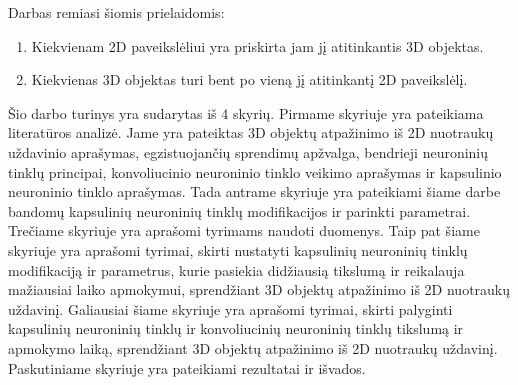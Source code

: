 Darbas remiasi šiomis prielaidomis:

\begin{enumerate}
	\item Kiekvienam 2D paveikslėliui yra priskirta jam jį atitinkantis 3D objektas.
	\item Kiekvienas 3D objektas turi bent po vieną jį atitinkantį 2D paveikslėlį.
\end{enumerate}

Šio darbo turinys yra sudarytas iš 4 skyrių. Pirmame skyriuje yra pateikiama literatūros analizė. Jame yra pateiktas 3D objektų atpažinimo iš 2D nuotraukų uždavinio aprašymas, egzistuojančių sprendimų apžvalga, bendrieji neuroninių tinklų principai, konvoliucinio neuroninio tinklo veikimo aprašymas ir kapsulinio neuroninio tinklo aprašymas.
Tada antrame skyriuje yra pateikiami šiame darbe bandomų kapsulinių neuroninių tinklų modifikacijos ir parinkti parametrai.
Trečiame skyriuje yra aprašomi tyrimams naudoti duomenys.
Taip pat šiame skyriuje yra aprašomi tyrimai, skirti nustatyti kapsulinių neuroninių tinklų modifikaciją ir parametrus, kurie pasiekia didžiausią tikslumą ir reikalauja mažiausiai laiko apmokymui, sprendžiant 3D objektų atpažinimo iš 2D nuotraukų uždavinį.
Galiausiai šiame skyriuje yra aprašomi tyrimai, skirti palyginti kapsulinių neuroninių tinklų ir konvoliucinių neuroninių tinklų tikslumą ir apmokymo laiką, sprendžiant 3D objektų atpažinimo iš 2D nuotraukų uždavinį.
Paskutiniame skyriuje yra pateikiami rezultatai ir išvados.
